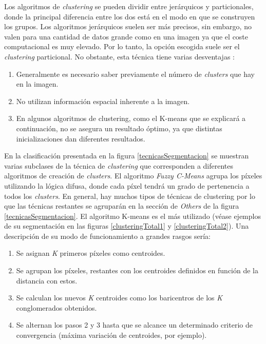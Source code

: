Los algoritmos de \textit{clustering} se pueden dividir entre jer\'{a}rquicos y particionales, donde la principal diferencia entre los dos est\'{a} en el modo en que se construyen los grupos. Los algoritmos jer\'{a}rquicos suelen ser m\'{a}s precisos, sin embargo, no valen para una cantidad de datos grande como en una imagen ya que el coste computacional es muy elevado. Por lo tanto, la opci\'{o}n escogida suele ser el \textit{clustering} particional. No obstante, esta t\'{e}cnica tiene varias desventajas \cite{oli1}:

\begin{enumerate}
	\item Generalmente es necesario saber previamente el n\'{u}mero de \textit{clusters} que hay en la imagen. 
	\item No utilizan informaci\'{o}n espacial inherente a la imagen.
	\item En algunos algoritmos de clustering, como el K-means que se explicar\'{a} a continuaci\'{o}n, no se asegura un resultado \'{o}ptimo, ya que distintas inicializaciones dan diferentes resultados.
\end{enumerate} 

En la clasificaci\'{o}n presentada en la figura \ref{tecnicasSegmentacion} se muestran varias subclases de la t\'{e}cnica de \textit{clustering} que corresponden a diferentes algoritmos de creaci\'{o}n de \textit{clusters}. El algoritmo \textit{Fuzzy C-Means} agrupa los p\'{i}xeles utilizando la l\'{o}gica difusa, donde cada p\'{i}xel tendr\'{a} un grado de pertenencia a todos los \textit{clusters}. En general, hay muchos tipos de t\'{e}cnicas de clustering por lo que las t\'{e}cnicas restantes se agrupar\'{a}n en la secci\'{o}n de \textit{Others} de la figura \ref{tecnicasSegmentacion}. El algoritmo K-means es el m\'{a}s utilizado (v\'{e}ase ejemplos de su segmentaci\'{o}n en las figuras \ref{clusteringTotal1} y \ref{clusteringTotal2}). Una descripci\'{o}n de su modo de funcionamiento a grandes rasgos ser\'{i}a:

\begin{enumerate}
 \item Se asignan \textit{K} primeros p\'{i}xeles como centroides.
 \item Se agrupan los p\'{i}xeles, restantes con los centroides definidos en funci\'{o}n de la distancia con estos.
 \item Se calculan los nuevos \textit{K} centroides como los baricentros de los \textit{K} conglomerados obtenidos.
 \item Se alternan los pasos 2 y 3 hasta que se alcance un determinado criterio de convergencia (m\'{a}xima variaci\'{o}n de centroides, por ejemplo).
\end{enumerate}

